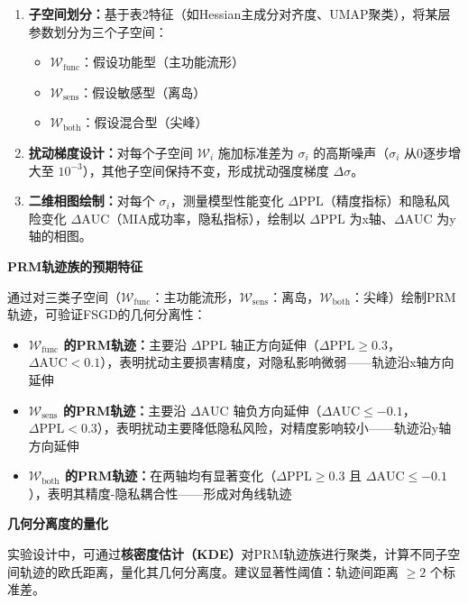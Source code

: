 \documentclass[letterpaper,twocolumn,10pt]{article}
\begin{document}
\begin{enumerate}
\item \textbf{子空间划分：}基于表2特征（如Hessian主成分对齐度、UMAP聚类），将某层参数划分为三个子空间：
\begin{itemize}
\item $\mathcal{W}_{\text{func}}$：假设功能型（主功能流形）
\item $\mathcal{W}_{\text{sens}}$：假设敏感型（离岛）
\item $\mathcal{W}_{\text{both}}$：假设混合型（尖峰）
\end{itemize}

\item \textbf{扰动梯度设计：}对每个子空间 $\mathcal{W}_i$ 施加标准差为 $\sigma_i$ 的高斯噪声（$\sigma_i$ 从0逐步增大至 $10^{-3}$），其他子空间保持不变，形成扰动强度梯度 $\Delta\sigma$。

\item \textbf{二维相图绘制：}对每个 $\sigma_i$，测量模型性能变化 $\Delta\text{PPL}$（精度指标）和隐私风险变化 $\Delta\text{AUC}$（MIA成功率，隐私指标），绘制以 $\Delta\text{PPL}$ 为x轴、$\Delta\text{AUC}$ 为y轴的相图。
\end{enumerate}

\textbf{PRM轨迹族的预期特征}

通过对三类子空间（$\mathcal{W}_{\text{func}}$：主功能流形，$\mathcal{W}_{\text{sens}}$：离岛，$\mathcal{W}_{\text{both}}$：尖峰）绘制PRM轨迹，可验证FSGD的几何分离性：

\begin{itemize}
\item \textbf{$\mathcal{W}_{\text{func}}$ 的PRM轨迹：}主要沿 $\Delta\text{PPL}$ 轴正方向延伸（$\Delta\text{PPL} \geq 0.3$，$\Delta\text{AUC} < 0.1$），表明扰动主要损害精度，对隐私影响微弱——轨迹沿x轴方向延伸

\item \textbf{$\mathcal{W}_{\text{sens}}$ 的PRM轨迹：}主要沿 $\Delta\text{AUC}$ 轴负方向延伸（$\Delta\text{AUC} \leq -0.1$，$\Delta\text{PPL} < 0.3$），表明扰动主要降低隐私风险，对精度影响较小——轨迹沿y轴方向延伸

\item \textbf{$\mathcal{W}_{\text{both}}$ 的PRM轨迹：}在两轴均有显著变化（$\Delta\text{PPL} \geq 0.3$ 且 $\Delta\text{AUC} \leq -0.1$），表明其精度-隐私耦合性——形成对角线轨迹
\end{itemize}

\textbf{几何分离度的量化}

实验设计中，可通过\textbf{核密度估计（KDE）}对PRM轨迹族进行聚类，计算不同子空间轨迹的欧氏距离，量化其几何分离度。建议显著性阈值：轨迹间距离 $\geq 2$ 个标准差。
\end{document}
